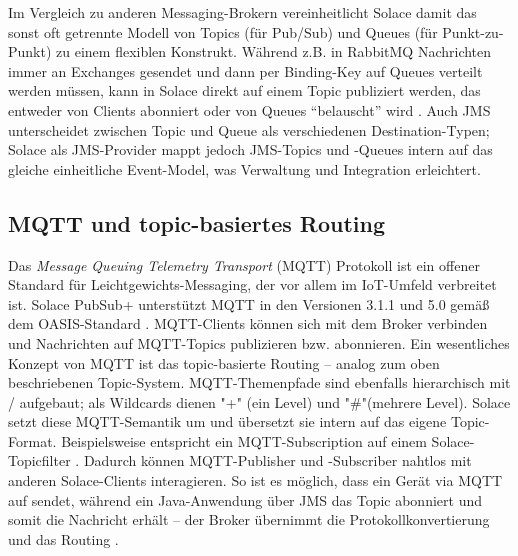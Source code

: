 Im Vergleich zu anderen Messaging-Brokern vereinheitlicht Solace damit das sonst oft getrennte Modell von Topics (für Pub/Sub) und Queues (für Punkt-zu-Punkt) zu einem flexiblen Konstrukt. Während z.B. in RabbitMQ Nachrichten immer an Exchanges gesendet und dann per Binding-Key auf Queues verteilt werden müssen, kann in Solace direkt auf einem Topic publiziert werden, das entweder von Clients abonniert oder von Queues “belauscht” wird \cite{SolaceTopicWildcard}. Auch JMS unterscheidet zwischen Topic und Queue als verschiedenen Destination-Typen; Solace als JMS-Provider mappt jedoch JMS-Topics und -Queues intern auf das gleiche einheitliche Event-Model, was Verwaltung und Integration erleichtert.

\subsection{MQTT und topic-basiertes Routing}

Das \textit{Message Queuing Telemetry Transport} (MQTT) Protokoll ist ein offener Standard für Leichtgewichts-Messaging, der vor allem im IoT-Umfeld verbreitet ist. Solace PubSub+ unterstützt MQTT in den Versionen 3.1.1 und 5.0 gemäß dem OASIS-Standard \cite{SolaceMQTT}. MQTT-Clients können sich mit dem Broker verbinden und Nachrichten auf MQTT-Topics publizieren bzw. abonnieren. Ein wesentliches Konzept von MQTT ist das topic-basierte Routing – analog zum oben beschriebenen Topic-System. MQTT-Themenpfade sind ebenfalls hierarchisch mit / aufgebaut; als Wildcards dienen "+" (ein Level) und "\#"(mehrere Level). Solace setzt diese MQTT-Semantik um und übersetzt sie intern auf das eigene Topic-Format. Beispielsweise entspricht ein MQTT-Subscription auf  einem Solace-Topicfilter . Dadurch können MQTT-Publisher und -Subscriber nahtlos mit anderen Solace-Clients interagieren. So ist es möglich, dass ein Gerät via MQTT auf  sendet, während ein Java-Anwendung über JMS das Topic  abonniert und somit die Nachricht erhält – der Broker übernimmt die Protokollkonvertierung und das Routing \cite{SolaceProtocols}.

